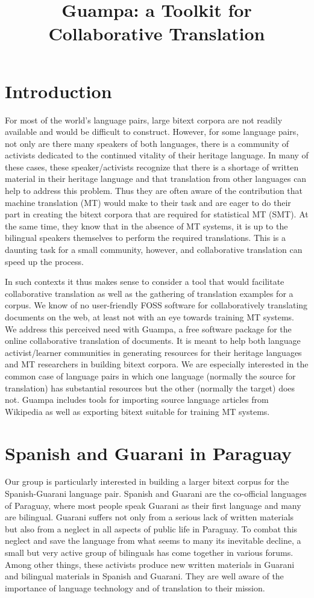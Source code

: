 \documentclass[10pt, a4paper]{article}
\title{Guampa: a Toolkit for Collaborative Translation}
\begin{document}
\maketitleabstract

\section{Introduction}
For most of the world's language pairs, large bitext corpora are not readily
available and would be difficult to construct. However, for some language
pairs, not only are there many speakers of both languages, there is a community
of activists dedicated to the continued vitality of their heritage language. In
many of these cases, these speaker/activists recognize that there is a shortage
of written material in their heritage language and that translation from other
languages can help to address this problem. Thus they are often aware of the
contribution that machine translation (MT) would make to their task and are eager to do their part in
creating the bitext corpora that are required for statistical MT (SMT). At the same time, they
know that in the absence of MT systems, it is up to the bilingual speakers
themselves to perform the required translations. This is a daunting task for a
small community, however, and collaborative translation can speed up the
process.

In such contexts it thus makes sense to consider a tool that would facilitate
collaborative translation as well as the gathering of translation examples for
a corpus. We know of no user-friendly FOSS software for collaboratively
translating documents on the web, at least not with an eye towards training MT
systems. We address this perceived need with Guampa, a free software package
for the online collaborative translation of documents. It is meant to help both
language activist/learner communities in generating resources for their
heritage languages and MT researchers in building bitext corpora. We are
especially interested in the common case of language pairs in which one
language (normally the source for translation) has substantial resources but
the other (normally the target) does not. Guampa includes tools for importing
source language articles from Wikipedia as well as exporting bitext suitable
for training MT systems.

\section{Spanish and Guarani in Paraguay}
Our group is particularly interested in building a larger bitext corpus for the
Spanish-Guarani language pair. Spanish and Guarani are the co-official
languages of Paraguay, where most people speak Guarani as their first language
and many are bilingual. Guarani suffers not only from a serious lack of
written materials but also from a neglect in all aspects of public life in
Paraguay. To combat this neglect and save the language from what seems to many
its inevitable decline, a small but very active group of bilinguals has come
together in various forums. Among other things, these activists produce new
written materials in Guarani and bilingual materials in Spanish and Guarani.
They are well aware of the importance of language technology and of translation
to their mission.
\end{document}
